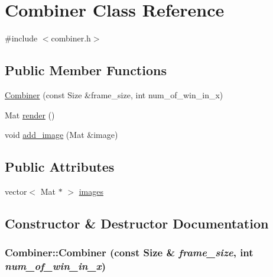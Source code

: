 \hypertarget{class_combiner}{
\section{Combiner Class Reference}
\label{class_combiner}
}


{\ttfamily \#include $<$combiner.h$>$}

\subsection*{Public Member Functions}
\begin{DoxyCompactItemize}
\item 
\hyperlink{class_combiner_a3d60ff2e7b79eb103d78d416131fa07b}{Combiner} (const Size \&frame\_\-size, int num\_\-of\_\-win\_\-in\_\-x)
\item 
Mat \hyperlink{class_combiner_aee8b8d179fbdccb013abf4b244d51e7e}{render} ()
\item 
void \hyperlink{class_combiner_a40ddc10da1134e1e003cf6ddf46da8b9}{add\_\-image} (Mat \&image)
\end{DoxyCompactItemize}
\subsection*{Public Attributes}
\begin{DoxyCompactItemize}
\item 
vector$<$ Mat $\ast$ $>$ \hyperlink{class_combiner_abe68e0620c00e937b066a11ed3ce51dc}{images}
\end{DoxyCompactItemize}


\subsection{Constructor \& Destructor Documentation}
\hypertarget{class_combiner_a3d60ff2e7b79eb103d78d416131fa07b}{
\subsubsection[{Combiner}]{\setlength{\rightskip}{0pt plus 5cm}Combiner::Combiner (const Size \& {\em frame\_\-size}, \/  int {\em num\_\-of\_\-win\_\-in\_\-x})}}
\label{class_combiner_a3d60ff2e7b79eb103d78d416131fa07b}


